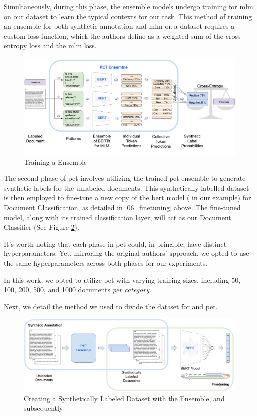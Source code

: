 Simultaneously, during this phase, the ensemble models undergo training for \gls{mlm} on our dataset to learn the typical contexts for our task. This method of training an ensemble for both synthetic annotation and \gls{mlm} on a dataset requires a custom loss function, which the authors define as a weighted sum of the cross-entropy loss and the \gls{mlm} loss.






\begin{figure}
    \centering
    \includegraphics[width=\textwidth]{Figures/06/06_pet_training_1_pet_ensemble.png}
    \caption{Training a \PET{} Ensemble}
    \label{fig:06_pet_1_pet_ensemble}
\end{figure}


The second phase of \gls{pet} involves utilizing the trained \gls{pet} ensemble to generate synthetic labels for the unlabeled documents. 
This synthetically labelled dataset is then employed to fine-tune a new copy of the \gls{bert} model (\bertmultilingual{} in our example) for Document Classification, as detailed in \headerName{} \ref{06_finetuning} above. 
The fine-tuned model, along with its trained classification layer, will act as our Document Classifier (See Figure \ref{fig:06_pet_2_synthetic_finetuning}).

It's worth noting that each phase in \gls{pet} could, in principle, have distinct hyperparameters. Yet, mirroring the original authors' approach, we opted to use the same hyperparameters across both phases for our experiments.

In this work, we opted to utilize \gls{pet} with varying training sizes, including 50, 100, 200, 500, and 1000 documents \emph{per category}.

Next, we detail the method we used to divide the dataset for \finetuning{} and \gls{pet}.


\begin{figure}
    \centering
    \includegraphics[width=\textwidth]{Figures/06/06_pet_training_2_synthetic_finetuning.png}
    \caption{Creating a Synthetically Labeled Dataset with the \PET{} Ensemble, and subsequently \finetuning{}}
    \label{fig:06_pet_2_synthetic_finetuning}
\end{figure}

